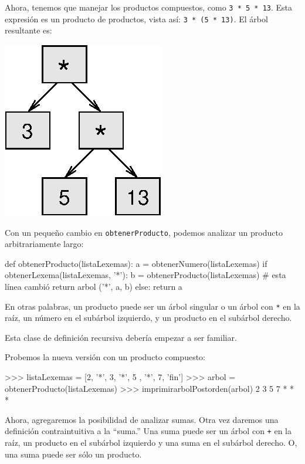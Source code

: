 Ahora, tenemos que manejar los productos compuestos, como \texttt{3
{*} 5 {*} 13}. Esta expresión es un producto de productos, vista así:
\texttt{3 {*} (5 {*} 13)}. El árbol resultante es:

\beforefig \centerline{\includegraphics{illustrations/tree4}}
\afterfig

Con un pequeño cambio en \texttt{obtenerProducto}, podemos analizar
un producto arbitrariamente largo:

\beforeverb 
\begin{pythoncode}
def obtenerProducto(listaLexemas):
  a = obtenerNumero(listaLexemas)
  if obtenerLexema(listaLexemas, '*'):
    b = obtenerProducto(listaLexemas)   # esta línea cambió
    return arbol ('*', a, b)
  else:
    return a
\end{pythoncode}
\afterverb En otras palabras, un producto puede ser un árbol singular
o un árbol con \texttt{{*}} en la raíz, un número en el subárbol izquierdo,
y un producto en el subárbol derecho.

Esta clase de definición recursiva debería empezar a ser familiar.

  

Probemos la nueva versión con un producto compuesto:

\beforeverb 
\begin{pyconcode}
>>> listaLexemas = [2, '*', 3, '*', 5 , '*', 7, 'fin']
>>> arbol = obtenerProducto(listaLexemas)
>>> imprimirarbolPostorden(arbol)
2 3 5 7 * * *
\end{pyconcode}
\afterverb Ahora, agregaremos la posibilidad de analizar sumas. Otra
vez daremos una definición contraintuitiva a la ``suma.'' Una suma
puede ser un árbol con \texttt{+} en la raíz, un producto en el subárbol
izquierdo y una suma en el subárbol derecho. O, una suma puede ser
sólo un producto.

